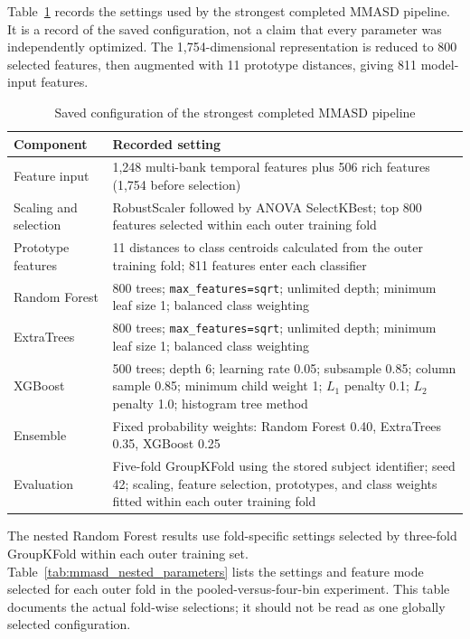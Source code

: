 \documentclass[a4paper,12pt]{report}
\begin{document}
Table~\ref{tab:mmasd_best_parameters} records the settings used by the strongest completed MMASD pipeline. It is a record of the saved configuration, not a claim that every parameter was independently optimized. The 1,754-dimensional representation is reduced to 800 selected features, then augmented with 11 prototype distances, giving 811 model-input features.

\begin{table}[htbp]
\centering
\small
\setlength{\tabcolsep}{6pt}
\renewcommand{\arraystretch}{1.15}
\caption{Saved configuration of the strongest completed MMASD pipeline}
\label{tab:mmasd_best_parameters}
\begin{tabular}{p{3.4cm}p{11.5cm}}
\hline
\textbf{Component} & \textbf{Recorded setting} \\
\hline
Feature input & 1,248 multi-bank temporal features plus 506 rich features (1,754 before selection) \\
Scaling and selection & RobustScaler followed by ANOVA SelectKBest; top 800 features selected within each outer training fold \\
Prototype features & 11 distances to class centroids calculated from the outer training fold; 811 features enter each classifier \\
Random Forest & 800 trees; \texttt{max\_features=sqrt}; unlimited depth; minimum leaf size 1; balanced class weighting \\
ExtraTrees & 800 trees; \texttt{max\_features=sqrt}; unlimited depth; minimum leaf size 1; balanced class weighting \\
XGBoost & 500 trees; depth 6; learning rate 0.05; subsample 0.85; column sample 0.85; minimum child weight 1; $L_1$ penalty 0.1; $L_2$ penalty 1.0; histogram tree method \\
Ensemble & Fixed probability weights: Random Forest 0.40, ExtraTrees 0.35, XGBoost 0.25 \\
Evaluation & Five-fold GroupKFold using the stored subject identifier; seed 42; scaling, feature selection, prototypes, and class weights fitted within each outer training fold \\
\hline
\end{tabular}
\end{table}

The nested Random Forest results use fold-specific settings selected by three-fold GroupKFold within each outer training set. Table~\ref{tab:mmasd_nested_parameters} lists the settings and feature mode selected for each outer fold in the pooled-versus-four-bin experiment. This table documents the actual fold-wise selections; it should not be read as one globally selected configuration.
\end{document}
